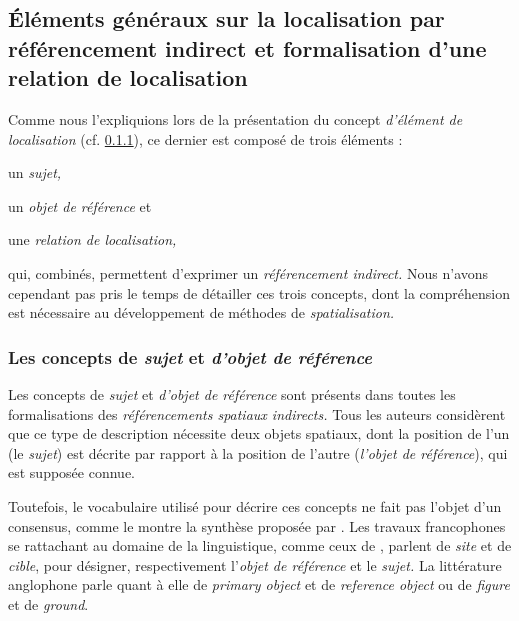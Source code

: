 

\subsection{Éléments généraux sur la localisation par référencement
  indirect et formalisation d'une relation de localisation}

Comme nous l'expliquions lors de la présentation du concept
\emph{d'élément de localisation} (cf. \ref{}), ce dernier est
composé de trois éléments :
%
\begin{enumerate*}[label=(\alph*)]
\item \label{i:site} un \emph{sujet,}
\item \label{i:cible} un \emph{objet de référence} et
\item une \emph{relation de localisation,}
\end{enumerate*}
%
qui, combinés, permettent d'exprimer un \emph{référencement indirect.} 
Nous n'avons cependant pas pris le temps de détailler ces trois
concepts, dont la compréhension est nécessaire au développement de
méthodes de \emph{spatialisation.}

\subsubsection{Les concepts de \emph{sujet} et \emph{d'objet de référence}}

Les concepts de \emph{sujet} et \emph{d'objet de référence} sont
présents dans toutes les formalisations des \emph{référencements
  spatiaux indirects.} Tous les auteurs considèrent que ce type de
description nécessite deux objets spatiaux, dont la position de l'un
(le \emph{sujet}) est décrite par rapport à la position de l'autre
(\emph{l'objet de référence}), qui est supposée connue.

Toutefois, le vocabulaire utilisé pour décrire ces concepts ne fait
pas l'objet d'un consensus, comme le montre la synthèse proposée par
\textcite{RetzSchmidt1988}.  Les travaux francophones se rattachant au
domaine de la linguistique, comme ceux de
\textcite{Vandeloise1986,Borillo1998, Aurnague1997, Mathet2000},
parlent de \emph{site} et de \emph{cible}, pour désigner,
respectivement l'\emph{objet de référence} et le \emph{sujet.} La
littérature anglophone parle quant à elle de \emph{primary object} et
de \emph{reference object} ou de \emph{figure} et de \emph{ground}.


